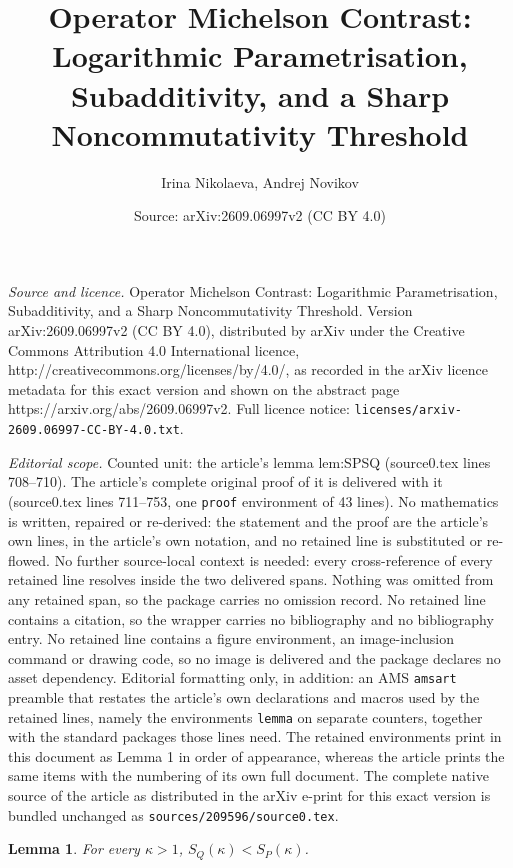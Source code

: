 \documentclass[10pt,a4paper]{amsart}
\title{Operator Michelson Contrast: Logarithmic Parametrisation, Subadditivity, and a Sharp Noncommutativity Threshold}
\author{Irina Nikolaeva, Andrej Novikov}
\date{Source: arXiv:2609.06997v2 (CC BY 4.0)}
\newtheorem{lemma}{Lemma}
\begin{document}
\maketitle

\noindent\emph{Source and licence.} Operator Michelson Contrast: Logarithmic Parametrisation, Subadditivity, and a Sharp Noncommutativity Threshold. Version arXiv:2609.06997v2 (CC BY 4.0), distributed by arXiv under the Creative Commons Attribution 4.0 International licence, http://creativecommons.org/licenses/by/4.0/, as recorded in the arXiv licence metadata for this exact version and shown on the abstract page https://arxiv.org/abs/2609.06997v2. Full licence notice: \texttt{licenses/arxiv-2609.06997-CC-BY-4.0.txt}.\par\smallskip

\noindent\textit{Editorial scope.} Counted unit: the article's lemma lem:SPSQ (source0.tex lines 708--710). The article's complete original proof of it is delivered with it (source0.tex lines 711--753, one \texttt{proof} environment of 43 lines). No mathematics is written, repaired or re-derived: the statement and the proof are the article's own lines, in the article's own notation, and no retained line is substituted or re-flowed.  No further source-local context is needed: every cross-reference of every retained line resolves inside the two delivered spans.  Nothing was omitted from any retained span, so the package carries no omission record.  No retained line contains a citation, so the wrapper carries no bibliography and no bibliography entry.  No retained line contains a figure environment, an image-inclusion command or drawing code, so no image is delivered and the package declares no asset dependency.  Editorial formatting only, in addition: an AMS \texttt{amsart} preamble that restates the article's own declarations and macros used by the retained lines, namely the environments \texttt{lemma} on separate counters, together with the standard packages those lines need.  The retained environments print in this document as Lemma 1 in order of appearance, whereas the article prints the same items with the numbering of its own full document.  The complete native source of the article as distributed in the arXiv e-print for this exact version is bundled unchanged as \texttt{sources/209596/source0.tex}.
\begin{lemma}\label{lem:SPSQ}
For every $\kappa>1$, $S_Q(\kappa) < S_P(\kappa)$.
\end{lemma}
\end{document}
